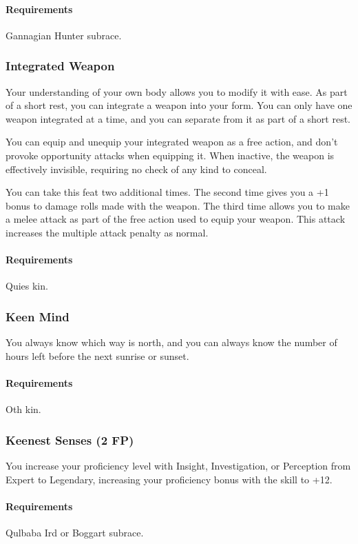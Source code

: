     \paragraph{Requirements} Gannagian Hunter subrace.
\subsubsection{Integrated Weapon} \label{feat::integratedweapon}
    Your understanding of your own body allows you to modify it with ease.
    As part of a short rest, you can integrate a weapon into your form.
    You can only have one weapon integrated at a time, and you can separate from it as part of a short rest.

    You can equip and unequip your integrated weapon as a free action, and don't provoke opportunity attacks when equipping it.
    When inactive, the weapon is effectively invisible, requiring no check of any kind to conceal.

    You can take this feat two additional times.
    The second time gives you a +1 bonus to damage rolls made with the weapon.
    The third time allows you to make a melee attack as part of the free action used to equip your weapon.
    This attack increases the multiple attack penalty as normal.
    \paragraph{Requirements} Quies kin.
\subsubsection{Keen Mind} \label{feat::keenmind}
    You always know which way is north, and you can always know the number of hours left before the next sunrise or sunset.
    \paragraph{Requirements} Oth kin.
\subsubsection{Keenest Senses (2 FP)} \label{feat::keenestsenses}
    You increase your proficiency level with Insight, Investigation, or Perception from Expert to Legendary, increasing your proficiency bonus with the skill to +12.
    \paragraph{Requirements} Qulbaba Ird or Boggart subrace.
